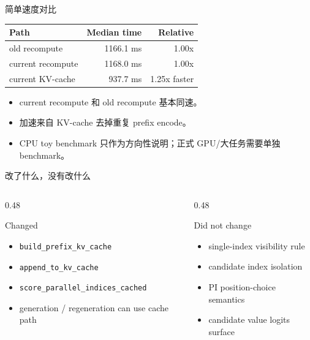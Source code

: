 \documentclass[aspectratio=169,10pt]{ctexbeamer}
\begin{document}
\begin{frame}{简单速度对比}
  \begin{table}
    \centering
    \begin{tabular}{lrr}
      \toprule
      Path & Median time & Relative \\
      \midrule
      old recompute & 1166.1 ms & 1.00x \\
      current recompute & 1168.0 ms & 1.00x \\
      current KV-cache & 937.7 ms & 1.25x faster \\
      \bottomrule
    \end{tabular}
  \end{table}

  \begin{itemize}
    \item current recompute 和 old recompute 基本同速。
    \item 加速来自 KV-cache 去掉重复 prefix encode。
    \item CPU toy benchmark 只作为方向性说明；正式 GPU/大任务需要单独 benchmark。
  \end{itemize}
\end{frame}

\begin{frame}{改了什么，没有改什么}
  \begin{columns}[T,onlytextwidth]
    \begin{column}{0.48\textwidth}
      \begin{block}{Changed}
        \begin{itemize}
          \item \texttt{build\_prefix\_kv\_cache}
          \item \texttt{append\_to\_kv\_cache}
          \item \texttt{score\_parallel\_indices\_cached}
          \item generation / regeneration can use cache path
        \end{itemize}
      \end{block}
    \end{column}
    \begin{column}{0.48\textwidth}
      \begin{block}{Did not change}
        \begin{itemize}
          \item single-index visibility rule
          \item candidate index isolation
          \item PI position-choice semantics
          \item candidate value logits surface
        \end{itemize}
      \end{block}
    \end{column}
  \end{columns}
\end{frame}
\end{document}
